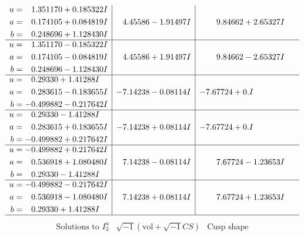 \documentclass[1p]{elsarticle_modified}
\theoremstyle{definition}
\newcommand{\I}{\sqrt{-1}}
\begin{document}
$$\begin{array}{c|c|c}
\begin{aligned}
u &= \phantom{-}1.351170 + 0.185322 I \\
a &= \phantom{-}0.174105 + 0.084819 I \\
b &= \phantom{-}0.248696 + 1.128430 I\end{aligned}
 & \phantom{-}4.45586 - 1.91497 I & \phantom{-}9.84662 + 2.65327 I \\ \hline\begin{aligned}
u &= \phantom{-}1.351170 - 0.185322 I \\
a &= \phantom{-}0.174105 - 0.084819 I \\
b &= \phantom{-}0.248696 - 1.128430 I\end{aligned}
 & \phantom{-}4.45586 + 1.91497 I & \phantom{-}9.84662 - 2.65327 I \\ \hline\begin{aligned}
u &= \phantom{-}0.29330 + 1.41288 I \\
a &= \phantom{-}0.283615 - 0.183655 I \\
b &= -0.499882 - 0.217642 I\end{aligned}
 & -7.14238 - 0.08114 I & -7.67724 + 0. I\phantom{ +0.000000I} \\ \hline\begin{aligned}
u &= \phantom{-}0.29330 - 1.41288 I \\
a &= \phantom{-}0.283615 + 0.183655 I \\
b &= -0.499882 + 0.217642 I\end{aligned}
 & -7.14238 + 0.08114 I & -7.67724 + 0. I\phantom{ +0.000000I} \\ \hline\begin{aligned}
u &= -0.499882 + 0.217642 I \\
a &= \phantom{-}0.536918 + 1.080480 I \\
b &= \phantom{-}0.29330 - 1.41288 I\end{aligned}
 & \phantom{-}7.14238 - 0.08114 I & \phantom{-}7.67724 - 1.23653 I \\ \hline\begin{aligned}
u &= -0.499882 - 0.217642 I \\
a &= \phantom{-}0.536918 - 1.080480 I \\
b &= \phantom{-}0.29330 + 1.41288 I\end{aligned}
 & \phantom{-}7.14238 + 0.08114 I & \phantom{-}7.67724 + 1.23653 I\\
 \hline 
 \end{array}$$\newpage$$\begin{array}{c|c|c}  
\text{Solutions to }I^u_{3}& \I (\text{vol} + \sqrt{-1}CS) & \text{Cusp shape}\\

\end{array}$$
\end{document}
